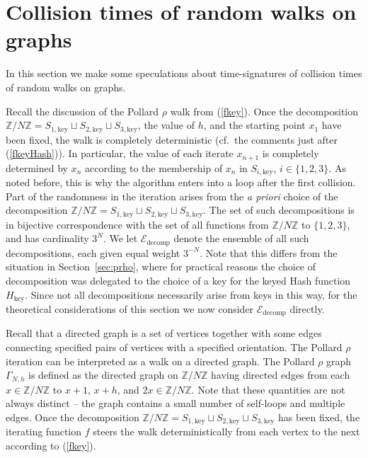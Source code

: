 \documentclass{llncs}
\numberwithin{equation}{section}
\newcommand{\Z}{{\mathbb{Z}}}
\renewcommand\({\left(}
\renewcommand\){\right)}
\begin{document}
\section{Collision times of random walks on graphs}\label{sec:expander}

In this section we make some speculations about time-signatures of collision times of random walks on graphs.


Recall the discussion of the Pollard $\rho$ walk from (\ref{fkey}).
 Once  the decomposition $\Z/N\Z=S_{1,\text{key}}\sqcup S_{2,\text{key}} \sqcup S_{3,\text{key}}$, the value of $h$, and the starting point $x_1$ have been fixed, the walk is completely deterministic   (cf.~the comments just after (\ref{fkeyHash})).  In particular, the value of each iterate $x_{n+1}$ is completely determined by $x_n$ according to the membership of $x_n$ in $S_{i,\text{key}}$, $i\in\{1,2,3\}$.  As noted before, this is why the algorithm enters into a loop after the first collision.
Part of the randomness in the iteration arises from    the {\it a priori} choice of  the   decomposition    $\Z/N\Z=S_{1,\text{key}}\sqcup S_{2,\text{key}} \sqcup S_{3,\text{key}}$.
The set of such decompositions is in bijective correspondence with the set of all functions from $\Z/N\Z$ to $\{1,2,3\}$, and has cardinality $3^N$.  We let ${\mathcal E}_{\text{decomp}}$ denote the ensemble of all such decompositions, each given equal weight $3^{-N}$.  Note that this differs from the situation in Section~\ref{sec:prho}, where for practical reasons the   choice of decomposition  was delegated to the choice of a key for the keyed Hash function $H_{\text{key}}$.   Since
  not all decompositions   necessarily arise from keys in this way,   for the theoretical considerations of this section we  now  consider ${\mathcal E}_{\text{decomp}}$  directly.


Recall that a directed graph is a set of vertices together with some edges connecting specified pairs of vertices with a specified orientation.
The Pollard $\rho$ iteration can be interpreted as a walk on a  directed graph.
The Pollard $\rho$ graph
$\Gamma_{N,h}$ is defined as the directed  graph on $\Z/N\Z$ having directed edges from each $x\in \Z/N\Z$ to $x+1$, $x+h$, and $2x\in \Z/N\Z$.  Note that these quantities are not always distinct -- the graph contains a small number of self-loops and multiple edges.  Once the decomposition $\Z/N\Z=S_{1,\text{key}}\sqcup S_{2,\text{key}} \sqcup S_{3,\text{key}}$ has been fixed, the iterating function $f$  steers the walk deterministically from each vertex to the next according to (\ref{fkey}).
\end{document}
